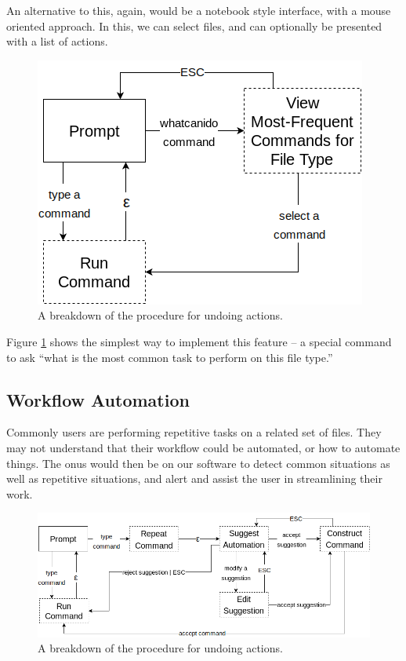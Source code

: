 An alternative to this, again, would be a notebook style interface, with a mouse
oriented approach. In this, we can select files, and can optionally be presented
with a list of actions.

\begin{figure}[H]
  \centering
  \includegraphics[width=0.8\linewidth]{figures/alternatives/file_c.png}
  \caption{A breakdown of the procedure for undoing actions.}
  \label{fig:discc}
\end{figure}

Figure \ref{fig:discc} shows the simplest way to implement this feature \--- a
special command to ask ``what is the most common task to perform on this file
type.''

\subsection{Workflow Automation}

Commonly users are performing repetitive tasks on a related set of files. They
may not understand that their workflow could be automated, or how to automate
things. The onus would then be on our software to detect common situations as
well as repetitive situations, and alert and assist the user in streamlining
their work.

\begin{figure}[H]
  \centering
  \includegraphics[width=0.8\linewidth]{figures/alternatives/automate_a.png}
  \caption{A breakdown of the procedure for undoing actions.}
  \label{fig:autoa}
\end{figure}

